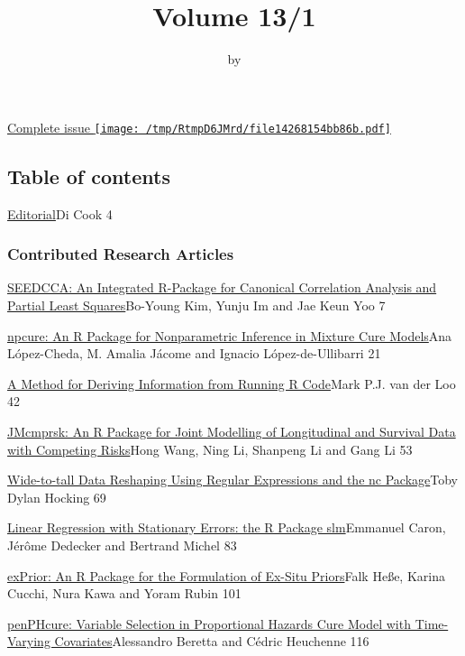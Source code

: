 \title{Volume 13/1}
\author{by }

\maketitle


\href{RJ-2021-1.pdf}{Complete issue
\protect\texttt{[image: /tmp/RtmpD6JMrd/file14268154bb86b.pdf]}}

\hypertarget{table-of-contents}{%
\subsection{Table of contents}\label{table-of-contents}}

\href{../../news/RJ-2021-1-editorial}{Editorial}Di Cook 4

\hypertarget{contributed-research-articles}{%
\subsubsection{Contributed Research
Articles}\label{contributed-research-articles}}

\href{../../articles/RJ-2021-026}{SEEDCCA: An Integrated R-Package for
Canonical Correlation Analysis and Partial Least Squares}Bo-Young Kim,
Yunju Im and Jae Keun Yoo 7

\href{../../articles/RJ-2021-027}{npcure: An R Package for Nonparametric
Inference in Mixture Cure Models}Ana López-Cheda, M. Amalia Jácome and
Ignacio López-de-Ullibarri 21

\href{../../articles/RJ-2021-056}{A Method for Deriving Information from
Running R Code}Mark P.J. van der Loo 42

\href{../../articles/RJ-2021-028}{JMcmprsk: An R Package for Joint
Modelling of Longitudinal and Survival Data with Competing Risks}Hong
Wang, Ning Li, Shanpeng Li and Gang Li 53

\href{../../articles/RJ-2021-029}{Wide-to-tall Data Reshaping Using
Regular Expressions and the nc Package}Toby Dylan Hocking 69

\href{../../articles/RJ-2021-030}{Linear Regression with Stationary
Errors: the R Package slm}Emmanuel Caron, Jérôme Dedecker and Bertrand
Michel 83

\href{../../articles/RJ-2021-031}{exPrior: An R Package for the
Formulation of Ex-Situ Priors}Falk Heße, Karina Cucchi, Nura Kawa and
Yoram Rubin 101

\href{../../articles/RJ-2021-061}{penPHcure: Variable Selection in
Proportional Hazards Cure Model with Time-Varying Covariates}Alessandro
Beretta and Cédric Heuchenne 116

